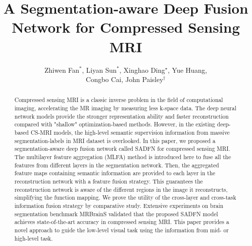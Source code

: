 \documentclass[runningheads]{llncs}
\begin{document}
\pagestyle{headings}
\mainmatter
\def\ECCV18SubNumber{****}  %

\title{A Segmentation-aware Deep Fusion Network for Compressed Sensing MRI} %


\author{Zhiwen Fan$^{\ast}$, Liyan Sun$^{\ast}$, Xinghao Ding$^{\star}$, Yue Huang,\\ Congbo Cai, John Paisley$^{\dagger}$\\}



\maketitle

\begin{abstract}
Compressed sensing MRI is a classic inverse problem in the field of computational imaging, accelerating the MR imaging by measuring less k-space data. The deep neural network models provide the stronger representation ability and faster reconstruction compared with "shallow" optimization-based methods. However, in the existing deep-based CS-MRI models, the high-level semantic supervision information from massive segmentation-labels in MRI dataset is overlooked. In this paper, we proposed a segmentation-aware deep fusion network called SADFN for compressed sensing MRI. The multilayer feature aggregation (MLFA) method is introduced here to fuse all the features from different layers in the segmentation network. Then, the aggregated feature maps containing semantic information are provided to each layer in the reconstruction network with a feature fusion strategy. This guarantees the reconstruction network is aware of the different regions in the image it reconstructs, simplifying the function mapping. We prove the utility of the cross-layer and cross-task information fusion strategy by comparative study. Extensive experiments on brain segmentation benchmark MRBrainS validated that the proposed SADFN model achieves state-of-the-art accuracy in compressed sensing MRI. This paper provides a novel approach to guide the low-level visual task using the information from mid- or high-level task.
\end{abstract}
\end{document}

